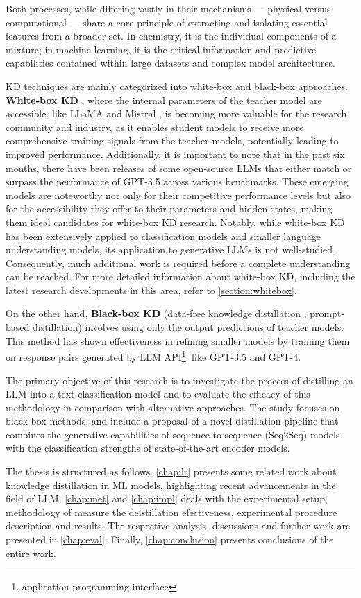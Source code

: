 Both processes, while differing vastly in their mechanisms — physical versus computational — share a core principle of extracting and isolating essential features from a broader set. In chemistry, it is the individual components of a mixture; in machine learning, it is the critical information and predictive capabilities contained within large datasets and complex model architectures.

KD techniques are mainly categorized into white-box and black-box approaches. \textbf{White-box KD} \cite{distilling}, where the internal parameters of the teacher model are accessible, like LLaMA \cite{llama,llama2} and Mistral \cite{mistral}, is becoming more valuable for the research community and industry, as it enables student models to receive more comprehensive training signals from the teacher models, potentially leading to improved performance. Additionally, it is important to note that in the past six months, there have been releases of some open-source LLMs that either match or surpass the performance of GPT-3.5 across various benchmarks. These emerging models are noteworthy not only for their competitive performance levels but also for the accessibility they offer to their parameters and hidden states, making them ideal candidates for white-box KD research. Notably, while white-box KD has been extensively applied to classification models and smaller language understanding models, its application to generative LLMs is not well-studied. Consequently, much additional work is required before a complete understanding can be reached. For more detailed information about white-box KD, including the latest research developments in this area, refer to \autoref{section:whitebox}.

On the other hand, \textbf{Black-box KD} (data-free knowledge distillation \cite{dfkd}, prompt-based distillation) involves using only the output predictions of teacher models. This method has shown effectiveness in refining smaller models by training them on response pairs generated by LLM API\footnote{application programming interface}, like GPT-3.5 and GPT-4.

The primary objective of this research is to investigate the process of distilling an LLM into a text classification model and to evaluate the efficacy of this methodology in comparison with alternative approaches. The study focuses on black-box methods, and include a proposal of a novel distillation pipeline that combines the generative capabilities of sequence-to-sequence (Seq2Seq) models with the classification strengths of state-of-the-art encoder models.

The thesis is structured as follows. \autoref{chap:lr} presents some related work about knowledge distillation in ML models, highlighting recent advancements in the field of LLM\@. \autoref{chap:met} and \autoref{chap:impl} deals with the experimental setup, methodology of measure the deistillation efectiveness, experimental procedure description and results. The respective analysis, discussions and further work are presented in \autoref{chap:eval}. Finally, \autoref{chap:conclusion} presents conclusions of the entire work.
